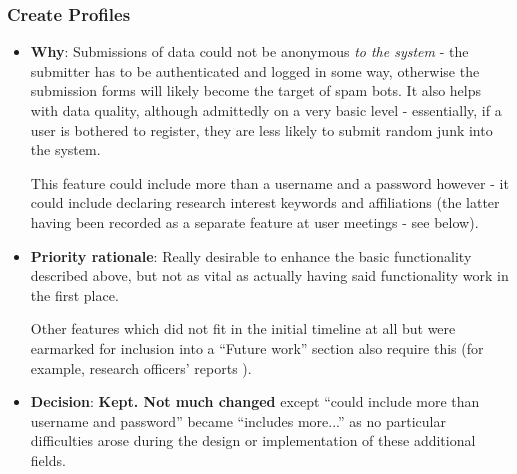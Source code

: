 \subsubsection{Create Profiles}
\begin{itemize}
 \item \textbf{Why}: Submissions of data could not be anonymous \emph{to the system} - the submitter has to be authenticated and logged in some way, otherwise the submission forms will likely become the target of spam bots. It also helps with data quality, although admittedly on a very basic level - essentially, if a user is bothered to register, they are less likely to submit random junk into the system.
 
 This feature could include more than a username and a password however - it could include declaring research interest keywords and affiliations (the latter having been recorded as a separate feature at user meetings - see below).
 \item \textbf{Priority rationale}: Really desirable to enhance the basic functionality described above, but not as vital as actually having said functionality work in the first place.
 
 Other features which did not fit in the initial timeline at all but were earmarked for inclusion into a ``Future work'' section also require this (for example, research officers' reports ).
 \item \textbf{Decision}: \textbf{Kept. Not much changed} except ``could include more than username and password'' became ``includes more...'' as no particular difficulties arose during the design or implementation of these additional fields.
\end{itemize}

